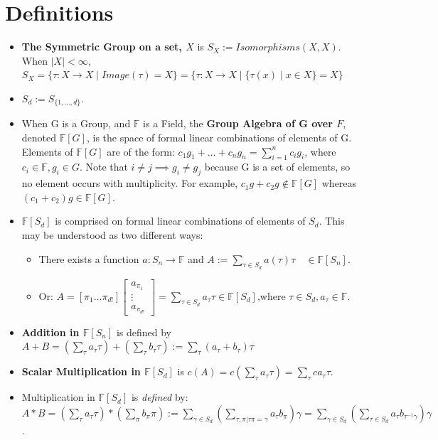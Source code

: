 \documentclass[12pt,a4paper]{article}
\begin{document}
\section{Definitions}
\begin{itemize}
\item \textbf{The Symmetric Group on a set, $X$} is $S_X := Isomorphisms(X,X)$. When $|X|<\infty$,$S_X = \{ \tau :X\rightarrow X \mid Image(\tau) = X \}  = \{\tau:X\rightarrow X \mid \{\tau(x) \mid x \in X\} = X \}$


\item $S_d := S_{\{ 1 ,\dots, d\}}.$


\item When G is a Group, and $\mathbb{F}$ is a Field, the \textbf{Group Algebra of G over $F$}, denoted $\mathbb{F}[G]$, is the space of formal linear combinations of elements of G. Elements of $\mathbb{F}[G]$ are of the form: $c_1 g_1 + \dots + c_n g_n = \sum^n_{i=1} c_i g_i$, where $c_i \in \mathbb{F}, g_i \in G$. Note that $i\neq j \implies g_i \neq g_j$ because G is a set of elements, so no element occurs with multiplicity. For example, $c_1 g + c_2 g \not\in \mathbb{F}[G]$ whereas $(c_1 + c_2)g \in \mathbb{F}[G]$.


\item $\mathbb{F}[S_d]$ is comprised on formal linear combinations of elements of $S_d$. This may be understood as two different ways:

\begin{itemize}
\item There exists a function $a:S_n \rightarrow \mathbb{F}$ and $A :=  \sum_{\tau \in S_d} a(\tau) \tau \quad \in \mathbb{F}[S_n]$.


\item Or: $A = [ \pi_1 \dots  \pi_{d!} ] \begin{bmatrix}a_{\pi_1} \\ \vdots  \\ a_{\pi_{d!}} \end{bmatrix} = \sum_{\tau \in S_d } a_\tau \tau \in \mathbb{F} [S_d]$,where $\tau \in S_d, a_\tau \in \mathbb{F}$.

\end{itemize}

\item \textbf{Addition in $\mathbb{F}[S_n]$} is defined by $A+B = (\sum_{\tau} a_\tau \tau) + (\sum_\tau b_\tau \tau) := \sum_\tau (a_\tau + b_\tau) \tau$


\item \textbf{Scalar Multiplication in $\mathbb{F}[S_d]$} is $c(A) = c(\sum_{\tau} a_\tau \tau)  = \sum_{\tau} ca_\tau \tau$.


\item Multiplication in $\mathbb{F}[S_d]$ is \emph{defined} by: $A*B =(\sum_{\tau} a_\tau \tau)* (\sum_\pi b_\pi \pi) :=\sum_{\gamma \in S_d}(\sum_{\tau,\pi | \tau\pi=\gamma} a_\tau b_\pi) \gamma = \sum_{\gamma \in S_d}(\sum_{  \tau \in S_d} a_\tau b_{\tau^{-1}\gamma} ) \gamma$.

\end{itemize}
\end{document}

